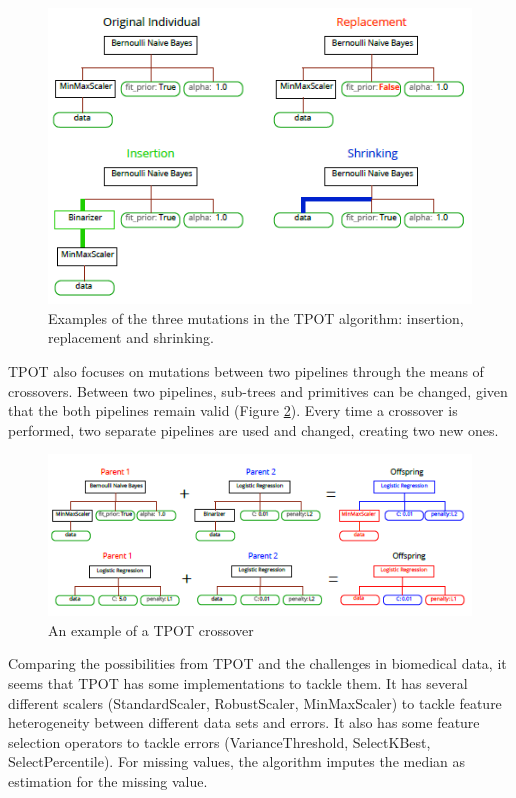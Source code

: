 \documentclass[10pt,a4paper]{article}
\begin{document}
	\begin{figure}[h!]
		\includegraphics[scale=1]{TPOTMutations.png}
		\caption{Examples of the three mutations in the TPOT algorithm: insertion, replacement and shrinking. \cite{Gijsbers2017Thesis}}
		\label{fig:TPOTMutations}
	\end{figure}
	
	TPOT also focuses on mutations between two pipelines through the means of crossovers. Between two pipelines, sub-trees and primitives can be changed, given that the both pipelines remain valid (Figure \ref{fig:TPOTCrossover}). Every time a crossover is performed, two separate pipelines are used and changed, creating two new ones.
	
	\begin{figure}[h!]
		\includegraphics[scale=1]{TPOTCrossover.png}
		\caption{An example of a TPOT crossover \cite{Gijsbers2017Thesis}}
		\label{fig:TPOTCrossover}
	\end{figure}
	
	Comparing the possibilities from TPOT and the challenges in biomedical data, it seems that TPOT has some implementations to tackle them. It has several different scalers (StandardScaler, RobustScaler, MinMaxScaler) to tackle feature heterogeneity between different data sets and errors. It also has some feature selection operators to tackle errors (VarianceThreshold, SelectKBest, SelectPercentile). For missing values, the algorithm imputes the median as estimation for the missing value.
	
\end{document}
